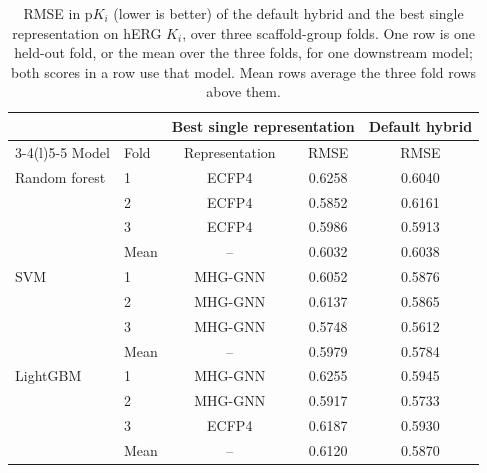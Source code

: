 \begin{table}[htbp]
\centering
\small
\begin{tabular}{@{}llccc@{}}
\toprule
 & & \multicolumn{2}{c}{Best single representation} & Default hybrid \\
\cmidrule(lr){3-4}\cmidrule(l){5-5}
Model & Fold & Representation & RMSE & RMSE \\
\midrule
Random forest & 1 & ECFP4 & 0.6258 & 0.6040 \\
 & 2 & ECFP4 & 0.5852 & 0.6161 \\
 & 3 & ECFP4 & 0.5986 & 0.5913 \\
 & Mean & -- & 0.6032 & 0.6038 \\
\addlinespace
SVM & 1 & MHG-GNN & 0.6052 & 0.5876 \\
 & 2 & MHG-GNN & 0.6137 & 0.5865 \\
 & 3 & MHG-GNN & 0.5748 & 0.5612 \\
 & Mean & -- & 0.5979 & 0.5784 \\
\addlinespace
LightGBM & 1 & MHG-GNN & 0.6255 & 0.5945 \\
 & 2 & MHG-GNN & 0.5917 & 0.5733 \\
 & 3 & ECFP4 & 0.6187 & 0.5930 \\
 & Mean & -- & 0.6120 & 0.5870 \\
\bottomrule
\end{tabular}
\caption[Default hybrid and best single representation on hERG $K_i$.]{RMSE in p$K_i$ (lower is better) of the default hybrid and the best single representation on hERG $K_i$, over three scaffold-group folds. One row is one held-out fold, or the mean over the three folds, for one downstream model; both scores in a row use that model. Mean rows average the three fold rows above them.}
\label{tab:prelim_default_vs_single}
\end{table}

